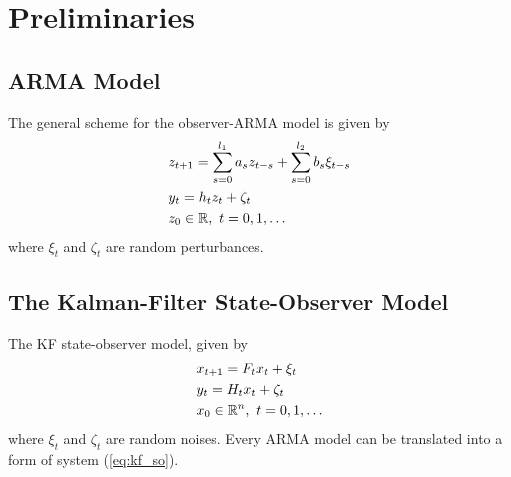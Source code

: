 \section{Preliminaries}\label{sec:pre}
\subsection{ARMA Model}
The general scheme for the observer-ARMA model is given by
\begin{equation}
  \begin{split}
    &z_{t+1}=\sum_{s=0}^{l_1}a_sz_{t-s}+\sum_{s=0}^{l_2}b_s\xi_{t-s}\\
    &y_t=h_tz_t+\zeta_t\\
    &z_0\in{\mathbb{R}}, \ t=0,1,\dots
  \end{split}
\end{equation}
where $\xi_t$ and $\zeta_t$ are random perturbances.

\subsection{The Kalman-Filter State-Observer Model}
The KF state-observer model, given by
\begin{equation}\label{eq:kf_so}
  \begin{split}
    &x_{t+1}=F_tx_t + \xi_t\\
    &y_t=H_tx_t+\zeta_t\\
    &x_0\in\R^n, \ t=0,1,\dots
  \end{split}
\end{equation}
where $\xi_t$ and $\zeta_t$ are random noises. Every ARMA model can be translated into a form of system (\ref{eq:kf_so}).



